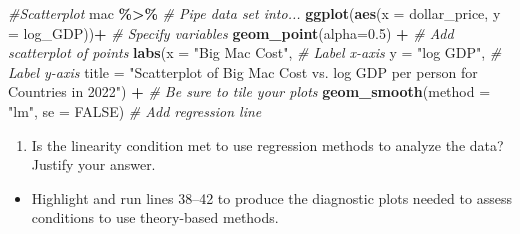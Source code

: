 \documentclass[
]{report}
\newenvironment{Shaded}{\begin{snugshade}}{\end{snugshade}}
\newcommand{\AttributeTok}[1]{\textcolor[rgb]{0.13,0.29,0.53}{#1}}
\newcommand{\CommentTok}[1]{\textcolor[rgb]{0.56,0.35,0.01}{\textit{#1}}}
\newcommand{\ConstantTok}[1]{\textcolor[rgb]{0.56,0.35,0.01}{#1}}
\newcommand{\DecValTok}[1]{\textcolor[rgb]{0.00,0.00,0.81}{#1}}
\newcommand{\FloatTok}[1]{\textcolor[rgb]{0.00,0.00,0.81}{#1}}
\newcommand{\FunctionTok}[1]{\textcolor[rgb]{0.13,0.29,0.53}{\textbf{#1}}}
\newcommand{\NormalTok}[1]{#1}
\newcommand{\OtherTok}[1]{\textcolor[rgb]{0.56,0.35,0.01}{#1}}
\newcommand{\SpecialCharTok}[1]{\textcolor[rgb]{0.81,0.36,0.00}{\textbf{#1}}}
\newcommand{\StringTok}[1]{\textcolor[rgb]{0.31,0.60,0.02}{#1}}
\providecommand{\tightlist}{%
  \setlength{\itemsep}{0pt}\setlength{\parskip}{0pt}}
\begin{document}
\begin{Shaded}
\begin{Highlighting}[]
\CommentTok{\#Scatterplot}
\NormalTok{mac }\SpecialCharTok{\%\textgreater{}\%} \CommentTok{\# Pipe data set into...}
  \FunctionTok{ggplot}\NormalTok{(}\FunctionTok{aes}\NormalTok{(}\AttributeTok{x =}\NormalTok{ dollar\_price, }\AttributeTok{y =}\NormalTok{ log\_GDP))}\SpecialCharTok{+}  \CommentTok{\# Specify variables}
  \FunctionTok{geom\_point}\NormalTok{(}\AttributeTok{alpha=}\FloatTok{0.5}\NormalTok{) }\SpecialCharTok{+}  \CommentTok{\# Add scatterplot of points}
  \FunctionTok{labs}\NormalTok{(}\AttributeTok{x =} \StringTok{"Big Mac Cost"}\NormalTok{,  }\CommentTok{\# Label x{-}axis}
       \AttributeTok{y =} \StringTok{"log GDP"}\NormalTok{,  }\CommentTok{\# Label y{-}axis}
       \AttributeTok{title =} \StringTok{"Scatterplot of Big Mac Cost vs. log GDP per person}
\StringTok{       for Countries in 2022"}\NormalTok{) }\SpecialCharTok{+}  \CommentTok{\# Be sure to tile your plots}
  \FunctionTok{geom\_smooth}\NormalTok{(}\AttributeTok{method =} \StringTok{"lm"}\NormalTok{, }\AttributeTok{se =} \ConstantTok{FALSE}\NormalTok{)  }\CommentTok{\# Add regression line}
\end{Highlighting}
\end{Shaded}

\begin{enumerate}
\def\labelenumi{\arabic{enumi}.}
\setcounter{enumi}{5}
\tightlist
\item
  Is the linearity condition met to use regression methods to analyze the data? Justify your answer.
\end{enumerate}

\vspace{0.3in}

\begin{itemize}
\tightlist
\item
  Highlight and run lines 38--42 to produce the diagnostic plots needed to assess conditions to use theory-based methods.
\end{itemize}

\begin{Shaded}
\end{Shaded}
\end{document}
